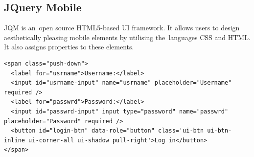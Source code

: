 \subsection{JQuery Mobile}
JQM is an~open source HTML5-based UI framework. It allows users to design aesthetically pleasing mobile elements by utilising the~languages CSS and HTML. It also assigns properties to these elements. 
\lstset{style=sharpc, numbers=left}
\begin{lstlisting}
<span class="push-down">
  <label for="usrname">Username:</label>
  <input id="usrname-input" name="usrname" placeholder="Username" required />
  <label for="passwrd">Password:</label>
  <input id="passwrd-input" input type="password" name="passwrd" placeholder="Password" required />
  <button id="login-btn" data-role="button" class='ui-btn ui-btn-inline ui-corner-all ui-shadow pull-right'>Log in</button>
</span>
\end{lstlisting}
